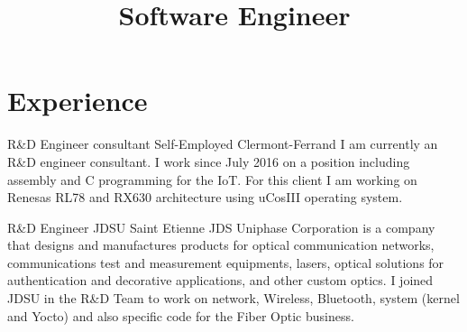 \documentclass[11pt,a4paper,sans]{moderncv}
\title{Software Engineer}
\begin{document}
\makecvtitle

\section{Experience}

{R\&D Engineer consultant}
{Self-Employed}
{Clermont-Ferrand}
{}
{I am currently an R\&D engineer consultant. I work since July 2016 on
a position including assembly and C programming for the IoT. For this
client I am working on Renesas RL78 and RX630 architecture using uCosIII operating system.}

{R\&D Engineer}
{JDSU}
{Saint Etienne}
{}
{JDS Uniphase Corporation is a company that designs and manufactures products
for optical communication networks, communications test and measurement
equipments, lasers, optical solutions for authentication and decorative
applications, and other custom optics.
I joined JDSU in the R\&D Team to work on network, Wireless, Bluetooth,
system (kernel and Yocto) and also specific code for the Fiber Optic
business.}
\end{document}
